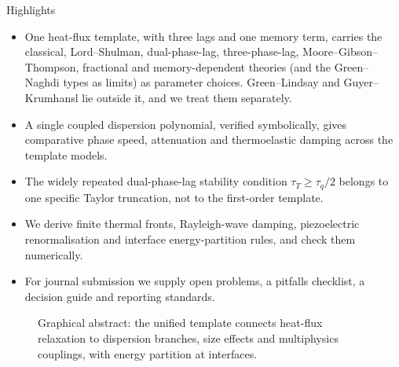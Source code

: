 \begin{summarybox}{Highlights}
\begin{itemize}[nosep]
\item One heat-flux template, with three lags and one memory term, carries the classical, Lord--Shulman, dual-phase-lag, three-phase-lag, Moore--Gibson--Thompson, fractional and memory-dependent theories (and the Green--Naghdi types as limits) as parameter choices. Green--Lindsay and Guyer--Krumhansl lie outside it, and we treat them separately.
\item A single coupled dispersion polynomial, verified symbolically, gives comparative phase speed, attenuation and thermoelastic damping across the template models.
\item The widely repeated dual-phase-lag stability condition $\tau_T\ge\tau_q/2$ belongs to one specific Taylor truncation, not to the first-order template.
\item We derive finite thermal fronts, Rayleigh-wave damping, piezoelectric renormalisation and interface energy-partition rules, and check them numerically.
\item For journal submission we supply open problems, a pitfalls checklist, a decision guide and reporting standards.
\end{itemize}
\end{summarybox}

\begin{figure}[t!]
\centering
{}
\caption{Graphical abstract: the unified template connects heat-flux relaxation to dispersion branches, size effects and multiphysics couplings, with energy partition at interfaces.}\label{fig:graphical}
\end{figure}

